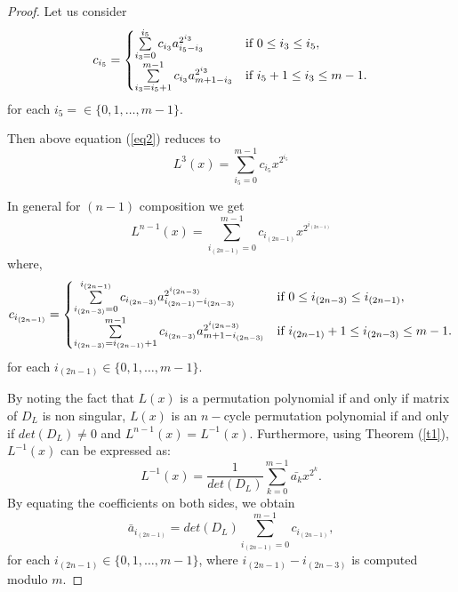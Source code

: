 \documentclass[12pt,a4paper]{article}
\begin{document}
\begin{proof}
     Let us consider \begin{equation}
        c_{i_5} = \begin{cases}
    \sum\limits_{i_3=0}^{i_5}c_{i_3}a_{i_5-i_3}^{2^{i_3}} & $\text{if $ 0\leq i_3\leq i_5 $}$,\\
    \sum\limits_{i_3=i_5+1}^{m-1}c_{i_3}a_{m+1-i_3}^{2^{i_3}} & $\text{if $i_5+1\leq i_3\leq m-1$}$.
		\end{cases}
    \end{equation}
  for each $i_5=\in \{0,1,\ldots,m-1\} $.  

  
    Then above equation (\ref{eq2}) reduces to
    \begin{equation}
        L^3(x)=\sum\limits_{i_5=0}^{m-1}c_{i_5}x^{2^{i_5}}
    \end{equation}
    
	In general for $(n-1)$ composition we get
	\begin{equation}
    L^{n-1}(x)=\sum\limits_{i_{(2n-1)}=0}^{m-1}c_{i_{(2n-1)}}x^{2^{i_{(2n-1)}}}
	\end{equation}
    where,\begin{equation}
        c_{i_{(2n-1)}} = \begin{cases}
    \sum\limits_{i_{(2n-3)}=0}^{i_{(2n-1)}}c_{i_{(2n-3)}}a_{i_{(2n-1)}-i_{(2n-3)}}^{2^{i_{(2n-3)}}} & $\text{if $ 0\leq i_{(2n-3)}\leq i_{(2n-1)} $}$,\\
    \sum\limits_{i_{(2n-3)}=i_{(2n-1)}+1}^{m-1}c_{i_{(2n-3)}}a_{m+1-i_{(2n-3)}}^{2^{i_{(2n-3)}}} & $\text{if $i_{(2n-1)}+1\leq i_{(2n-3)}\leq m-1$}$.
		\end{cases}
    \end{equation}
  for each $i_{(2n-1)}\in \{0,1,\ldots,m-1\} $.  
    
	By noting the fact that $ L(x) $ is a permutation polynomial if and only if matrix of $ D_{L} $ is non singular, $ L(x) $ is an $ n-$cycle permutation polynomial if and only if $ det(D_{L})\not=0 $ and $ L^{n-1}(x)=L^{-1}(x) $. Furthermore, using Theorem (\ref{t1}), $L^{-1}(x) $ can be expressed as:     
	\begin{equation}
		L^{-1}(x)=\frac{1}{det(D_{L})}\sum\limits_{k=0}^{m-1}\bar{a_{k}}x^{2^{k}}.
	\end{equation}
	By equating the coefficients on both sides, we obtain
	\begin{equation}
		\bar{a}_{i_{(2n-1)}}=det(D_{L})\sum\limits_{i_{(2n-1)}=0}^{m-1}c_{i_{(2n-1)}},
	\end{equation} 
	for each $ i_{(2n-1)}\in \{0,1,\ldots,m-1\} $, where $ i_{(2n-1)}-i_{(2n-3)} $ is computed modulo $ m $.
\end{proof}
\end{document}
